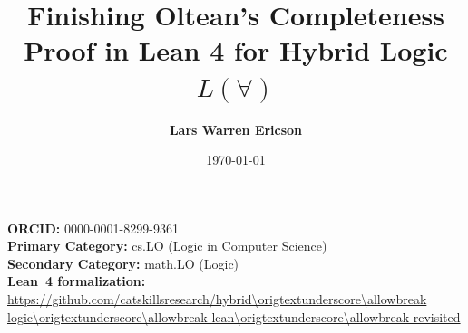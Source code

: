 \documentclass[11pt,a4paper]{article}
\title{\textbf{Finishing Oltean's Completeness Proof in Lean 4 for Hybrid Logic $L(\forall)$}}
\author[1]{\textbf{Lars Warren Ericson}}
\affil[1]{Catskills Research Company}
\affil[1]{\texttt{lars.ericson@catskillsresearch.com}}
\date{\today}
\renewcommand{\_}{\origtextunderscore\allowbreak}
\begin{document}
        \maketitle

        \begin{center}
          \small
          \textbf{ORCID:} 0000-0001-8299-9361 \\
          \textbf{Primary Category:} cs.LO (Logic in Computer Science) \\
          \textbf{Secondary Category:} math.LO (Logic) \\[0.5em]
          \textbf{Lean~4 formalization:} \url{https://github.com/catskillsresearch/hybrid\_logic\_lean\_revisited}
        \end{center}

        \begin{abstract}

\end{abstract}
\end{document}
